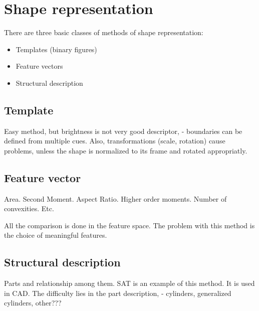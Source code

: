 
\section{Shape representation}
There are three basic classes of methods of shape representation:
\begin{itemize} 
  \item Templates (binary figures)
  \item Feature vectors
  \item Structural description
\end{itemize}

\subsection{Template}
Easy method, but brightness is not very good descriptor, - boundaries can be defined from multiple cues. Also, transformations (scale, rotation) cause problems, unless the shape is normalized to its frame and rotated appropriatly.
\subsection{Feature vector}
Area. Second Moment. Aspect Ratio. Higher order moments. Number of convexities. Etc.

All the comparison is done in the feature space. The problem with this method is the choice of meaningful features.
\subsection{Structural description}
Parts and relationship among them. SAT is an example of this method. It is used in CAD. The difficulty lies in the part description, - cylinders, generalized cylinders, other???





